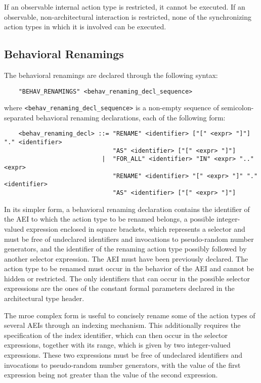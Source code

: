 If an observable internal action type is restricted, it cannot be executed. If an observable,
non-architectural interaction is restricted, none of the synchronizing action types in which it is involved
can be executed.


\subsection{Behavioral Renamings}

The behavioral renamings are declared through the following syntax:

	\begin{verbatim}
    "BEHAV_RENAMINGS" <behav_renaming_decl_sequence>
	\end{verbatim}

\noindent where {\tt <behav\_renaming\_decl\_sequence>} is a non-empty sequence of semicolon-separated
behavioral renaming declarations, each of the following form:

	\begin{verbatim}
    <behav_renaming_decl> ::= "RENAME" <identifier> ["[" <expr> "]"] "." <identifier>
                              "AS" <identifier> ["[" <expr> "]"]
                           |  "FOR_ALL" <identifier> "IN" <expr> ".." <expr>
                              "RENAME" <identifier> "[" <expr> "]" "." <identifier>
                              "AS" <identifier> ["[" <expr> "]"]
	\end{verbatim}

In its simpler form, a behavioral renaming declaration contains the identifier of the AEI to which the
action type to be renamed belongs, a possible integer-valued expression enclosed in square brackets, which
represents a selector and must be free of undeclared identifiers and invocations to pseudo-random number
generators, and the identifier of the renaming action type possibly followed by another selector expression.
The AEI must have been previously declared. The action type to be renamed must occur in the behavior of the
AEI and cannot be hidden or restricted. The only identifiers that can occur in the possible selector
expressions are the ones of the constant formal parameters declared in the architectural type header.

The mroe complex form is useful to concisely rename some of the action types of several AEIs through an
indexing mechanism. This additionally requires the specification of the index identifier, which can then
occur in the selector expressions, together with its range, which is given by two integer-valued
expressions. These two expressions must be free of undeclared identifiers and invocations to pseudo-random
number generators, with the value of the first expression being not greater than the value of the second
expression.

